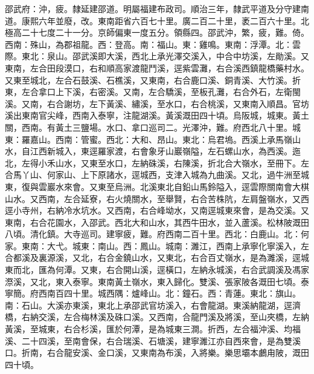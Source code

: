 \begin{pinyinscope}
邵武府：沖，疲。隸延建邵道。明屬福建布政司。順治三年，隸武平道及分守建南道。康熙六年並廢，改。東南距省六百七十里。廣二百二十里，袤二百六十里。北極高二十七度二十一分。京師偏東一度五分。領縣四。邵武沖，繁，疲，難。倚。西南：殊山，為郡祖龍。西：登高。南：福山。東：雞鳴。東南：浮潭。北：雲際。東北：泉山。邵武溪即大溪，西北上承光澤交溪入，中合中坊溪，左勛溪。又東南，左合田段漠口，右和順高家渡龍鬥溪，逕紫雲灘，右合溪西鎮龍橋藥村水。又東至城北，左合石鼓溪、石樵溪，又東南，右合鹿口溪、銅青溪、大竹溪。折東，左合拿口上下溪，右密溪。又南，左合驕溪，至板孔灘，右合外石，左衛閩溪。又南，右合謝坊，左下黃溪、繡溪，至水口，右合桃溪，又東南入順昌。官坊溪出東南官尖峰，西南入泰寧，注龍湖溪。黃溪溉田四十頃。烏阪城，城東。黃土關，西南。有黃土三鹽場。水口、拿口巡司二。光澤沖，難。府西北八十里。城東：羅嘉山。西南：管蜜。西北：大和、昂山。東北：烏君塢。西溪上承馬嶺山水，自江西新城入，東逕羅家渡，右會象牙山巖嶺隘，左石螺山水，為西溪。迤北，左得小禾山水，又東至水口，左納硃溪，右陳溪，折北合大嶺水，至冊下。左合馬丫山、何家山、上下原諸水，逕城西，支津入城為九曲溪。又北，過牛洲至城東，復與雲巖水來會。又東至烏洲。北溪東北自鉛山馬鈴隘入，逕雲際關南會大棋山水。又西南，左合延寮，右火燒關水，至舉賢，右合苦株阬，左肩盤嶺水，又西逕小寺州，右納冷水坑水。又西南，右合峰坳水，又南逕城東來會，是為交溪。又東南，右合花園水，入邵武。西北大和山水，其西牛田水，並入蘆溪。松林陂溉田八頃。清化鎮。大寺巡司。建寧疲，難。府西南二百十里。西北：白鹿山。北：何家。東南：大弋。城東：南山。西：鳳山。城南：濉江，西南上承寧化寧溪入，左合都溪及裏源溪，又北，右合金鐃山水，又東北，右合百丈嶺水，是為濉溪，逕城東而北，匯為何潭。又東，右合開山溪，逕橫口，左納永城溪，右合武調溪及馮家漈溪，又北，東入泰寧。東南黃土嶺水，東入歸化。雙溪、張家陂各溉田七頃。泰寧簡。府西南百四十里。城西隅：爐峰山。北：鐘石。西：青蓮。東北：旗山。南：石山。大溪亦東溪，東北上承邵武官坊溪入，右會龍湖。東溪納龍湖，逕濟橋，右納交溪，左合梅林溪及硃口溪。又西南，合龍門溪及將溪，至山夾橋，左納黃溪，至城東，右合杉溪，匯於何潭，是為城東三澗。折西，左合福沖溪、均福溪、二十四溪，至南會保，右合瑞溪、石塘溪，建寧濉江亦自西來會，是為雙溪口。折南，右合龍安溪、金口溪，又東南為布溪，入將樂。樂思壩本鸕甪陂，溉田四十頃。


\end{pinyinscope}
